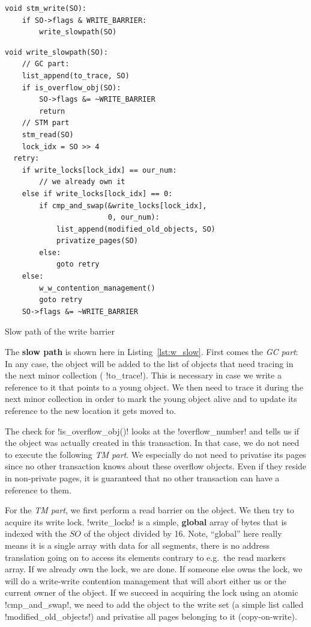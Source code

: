 \documentclass{sigplanconf}
\makeatletter
\renewcommand\lstinline[1][]{%
  \Collectverb{\@@myverb}%
}
\def\@@myverb#1{%
    \begingroup
    \fboxsep=0.2em
    \colorbox{verylightgray}{\oldlstinline|#1|}%
    \endgroup
}
\makeatother
\begin{document}
\begin{lstlisting}
void stm_write(SO):
	if SO->flags & WRITE_BARRIER:
		write_slowpath(SO)
\end{lstlisting}

\begin{code}[h]
\begin{lstlisting}
void write_slowpath(SO):
	// GC part:
	list_append(to_trace, SO)
	if is_overflow_obj(SO):
		SO->flags &= ~WRITE_BARRIER
		return
	// STM part
	stm_read(SO)
	lock_idx = SO >> 4
  retry:
	if write_locks[lock_idx] == our_num:
		// we already own it
	else if write_locks[lock_idx] == 0:
		if cmp_and_swap(&write_locks[lock_idx],
					    0, our_num):
			list_append(modified_old_objects, SO)
			privatize_pages(SO)
		else:
			goto retry
	else:
		w_w_contention_management()
		goto retry
	SO->flags &= ~WRITE_BARRIER
\end{lstlisting}

\caption{Slow path of the write barrier\label{lst:w_slow}}
\end{code}

The \textbf{slow path} is shown here in Listing~\ref{lst:w_slow}.
First comes the \emph{GC part}: In any case, the object will be added
to the list of objects that need tracing in the next minor collection
(\lstinline!to_trace!).  This is necessary in case we write a
reference to it that points to a young object. We then need to trace
it during the next minor collection in order to mark the young object
alive and to update its reference to the new location it gets moved
to.

The check for \lstinline!is_overflow_obj()! looks at the
\lstinline!overflow_number!  and tells us if the object was actually
created in this transaction. In that case, we do not need to execute
the following \emph{TM part}.  We especially do not need to privatise
its pages since no other transaction knows about these overflow
objects. Even if they reside in non-private pages, it is guaranteed
that no other transaction can have a reference to them.

For the \emph{TM part}, we first perform a read barrier on the
object. We then try to acquire its write lock. \lstinline!write_locks!
is a simple, \textbf{global} array of bytes that is indexed with the
$SO$ of the object divided by 16. Note, ``global'' here really means
it is a single array with data for all segments, there is no address
translation going on to access its elements contrary to e.g.\ the
read markers array.  If we already own the lock, we are done.
If someone else owns the lock, we will do a write-write contention
management that will abort either us or the current owner of the
object.  If we succeed in acquiring the lock using an atomic
\lstinline!cmp_and_swap!, we need to add the object to the write set
(a simple list called \lstinline!modified_old_objects!)  and privatise
all pages belonging to it (copy-on-write).
\end{document}
